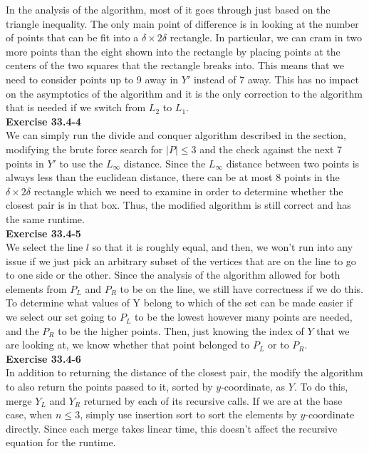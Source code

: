 \documentclass{article}
\begin{document}
In the analysis of the algorithm, most of it goes through just based on the triangle inequality. The only main point of difference is in looking at the number of points that can be fit into a $\delta \times 2\delta$ rectangle. In particular, we can cram in two more points than the eight shown into the rectangle by placing points at the centers of the two squares that the rectangle breaks into. This means that we need to consider points up to 9 away in $Y'$ instead of 7 away. This has no impact on the asymptotics of the algorithm and it is the only correction to the algorithm that is needed if we switch from $L_2$ to $L_1$.\\

\noindent\textbf{Exercise 33.4-4}\\

We can simply run the divide and conquer algorithm described in the section, modifying the brute force search for $|P| \leq 3$ and the check against the next 7 points in $Y'$ to use the $L_\infty$ distance.  Since the $L_\infty$ distance between two points is always less than the euclidean distance, there can be at most 8 points in the $\delta \times 2\delta$ rectangle which we need to examine in order to determine whether the closest pair is in that box.  Thus, the modified algorithm is still correct and has the same runtime. \\

\noindent\textbf{Exercise 33.4-5}\\

We select the line $l$ so that it is roughly equal, and then, we won't run into any issue if we just pick an arbitrary subset of the vertices that are on the line to go to one side or the other. Since the analysis of the algorithm allowed for both elements from $P_L$ and $P_R$ to be on the line, we still have correctness if we do this. To determine what values of Y belong to which of the set can be made easier if we select our set going to $P_L$ to be the lowest however many points are needed, and the $P_R$ to be the higher points. Then, just knowing the index of $Y$ that we are looking at, we know whether that point belonged to $P_L$ or to $P_R$.\\

\noindent\textbf{Exercise 33.4-6}\\

In addition to returning the distance of the closest pair, the modify the algorithm to also return the points passed to it, sorted by $y$-coordinate, as $Y$.  To do this, merge $Y_L$ and $Y_R$ returned by each of its recursive calls.  If we are at the base case, when $n \leq 3$, simply use insertion sort to sort the elements by $y$-coordinate directly. Since each merge takes linear time, this doesn't affect the recursive equation for the runtime. \\
\end{document}
